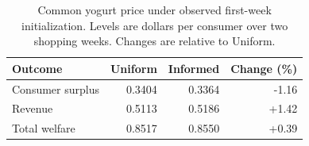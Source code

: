 \begin{table}[htbp]
\centering\small
\caption{Common yogurt price under observed first-week initialization. Levels are dollars per consumer over two shopping weeks. Changes are relative to Uniform.}
\label{tab:weekly-common-welfare}
\begin{tabular}{lrrr}
\toprule
Outcome & Uniform & Informed & Change (\%) \\
\midrule
Consumer surplus & 0.3404 & 0.3364 & -1.16 \\
Revenue & 0.5113 & 0.5186 & +1.42 \\
Total welfare & 0.8517 & 0.8550 & +0.39 \\
\bottomrule
\end{tabular}
\end{table}
